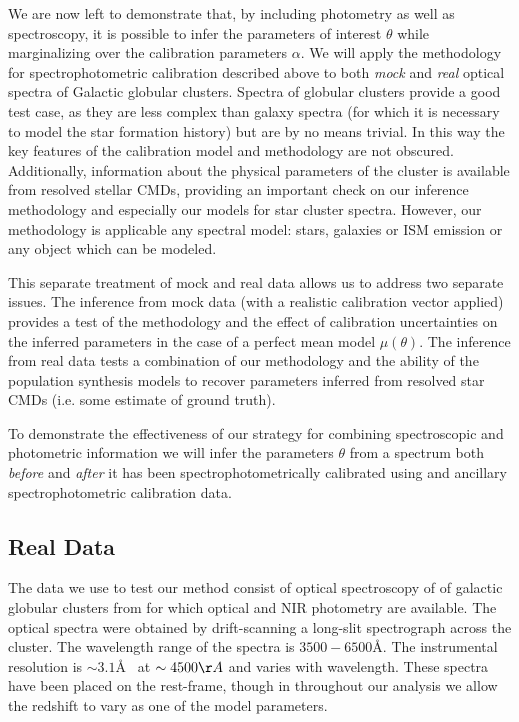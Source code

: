 \documentclass[iop,numberedappendix]{emulateapj}
\begin{document}
We are now left to demonstrate that, by including photometry as well
as spectroscopy, it is possible to infer the parameters of interest
$\theta$ while marginalizing over the calibration parameters $\alpha$.
We will apply the methodology for spectrophotometric calibration
described above to both \emph{mock} and \emph{real} optical spectra of
Galactic globular clusters.  Spectra of globular clusters provide a
good test case, as they are less complex than galaxy spectra (for
which it is necessary to model the star formation history) but are by
no means trivial. In this way the key features of the calibration
model and methodology are not obscured.  Additionally, information
about the physical parameters of the cluster is available from
resolved stellar CMDs, providing an important check on our inference
methodology and especially our models for star cluster spectra.  However,
our methodology is applicable any spectral model: stars, galaxies or
ISM emission or any object which can be modeled.

This separate treatment of mock and real data allows us to address two
separate issues.  The inference from mock data (with a realistic
calibration vector applied) provides a test of the methodology and the
effect of calibration uncertainties on the inferred parameters in the
case of a perfect mean model $\mu(\theta)$.  The inference from real
data tests a combination of our methodology and the ability of the
population synthesis models to recover parameters inferred from
resolved star CMDs (i.e. some estimate of ground truth).

To demonstrate the effectiveness of our strategy for combining
spectroscopic and photometric information we will infer the parameters
$\theta$ from a spectrum both \emph{before} and \emph{after} it has
been spectrophotometrically calibrated using and ancillary
spectrophotometric calibration data.


\subsection{Real Data}

The data we use to test our method consist of optical spectroscopy of
of galactic globular clusters from \citet{schiavon05} for which
optical and NIR photometry are available. The optical spectra were
obtained by drift-scanning a long-slit spectrograph across the
cluster.  The wavelength range of the spectra is $3500-6500$\AA. The
instrumental resolution is $\sim 3.1$\AA~ at $\sim 4500\AA$ and varies
with wavelength.  These spectra have been placed on the rest-frame,
though in throughout our analysis we allow the redshift to vary as one
of the model parameters. 
\end{document}
